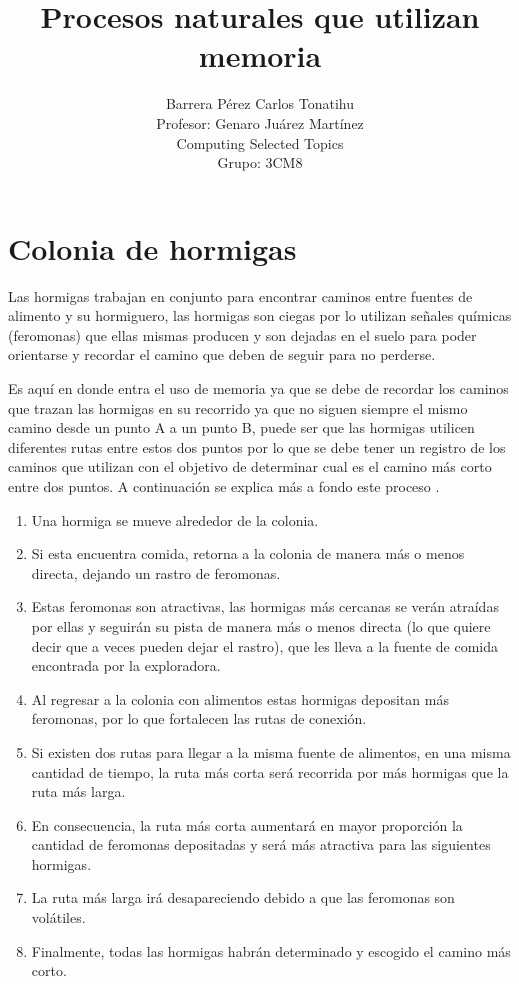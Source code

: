 \documentclass[12pt, titlepage]{article}
\title{Procesos naturales que utilizan memoria}
\author{Barrera Pérez Carlos Tonatihu \\ Profesor: Genaro Juárez Martínez \\ Computing Selected Topics \\ Grupo: 3CM8 }
\begin{document}
\maketitle

\newpage
\section{Colonia de hormigas}
Las hormigas trabajan en conjunto para encontrar caminos entre fuentes de alimento y su hormiguero, las hormigas son ciegas por lo utilizan señales químicas (feromonas) que ellas mismas producen y son dejadas en el suelo para poder orientarse y recordar el camino que deben de seguir para no perderse.

Es aquí en donde entra el uso de memoria ya que se debe de recordar los caminos que trazan las hormigas en su recorrido ya que no siguen siempre el mismo camino desde un punto A a un punto B, puede ser que las hormigas utilicen diferentes rutas entre estos dos puntos por lo que se debe tener un registro de los caminos que utilizan con el objetivo de determinar cual es el camino más corto entre dos puntos. A continuación se explica más a fondo este proceso \cite{HORMIGA}.

\begin{enumerate}
    \item Una hormiga se mueve alrededor de la colonia.
    \item Si esta encuentra comida, retorna a la colonia de manera más o menos directa, dejando un rastro de feromonas.
    \item Estas feromonas son atractivas, las hormigas más cercanas  se verán atraídas por ellas y seguirán su pista de manera más o menos directa (lo que quiere decir que a veces pueden dejar el rastro), que les lleva a la fuente de comida encontrada por la exploradora.
    \item Al regresar a la colonia con alimentos estas hormigas depositan más feromonas, por lo que fortalecen las rutas de conexión.
    \item Si existen dos rutas para llegar a la misma fuente de alimentos, en una misma cantidad de tiempo, la ruta más corta será recorrida por más hormigas que la ruta más larga.
    \item En consecuencia, la ruta más corta aumentará en mayor proporción la cantidad de feromonas depositadas y será más atractiva para las siguientes hormigas.
    \item La ruta más larga irá desapareciendo debido a que las feromonas son volátiles.
    \item Finalmente, todas las hormigas habrán determinado y escogido el camino más corto.
\end{enumerate}
\end{document}
